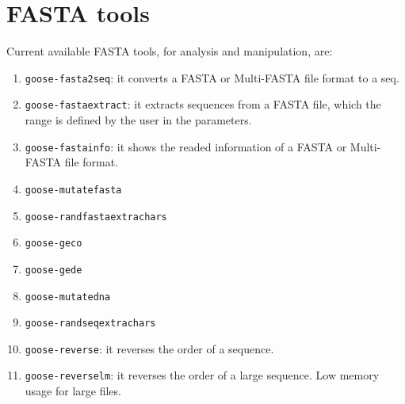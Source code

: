 \chapter{FASTA tools}
\label{fasta}

Current available FASTA tools, for analysis and manipulation, are:
\begin{enumerate}
\item \texttt{goose-fasta2seq}: it converts a FASTA or Multi-FASTA file format to a seq.
\item \texttt{goose-fastaextract}: it extracts sequences from a FASTA file, which the range is defined by the user in the parameters.
\item \texttt{goose-fastainfo}: it shows the readed information of a FASTA or Multi-FASTA file format.
\item \texttt{goose-mutatefasta}
\item \texttt{goose-randfastaextrachars}
\item \texttt{goose-geco}
\item \texttt{goose-gede}
\item \texttt{goose-mutatedna}
\item \texttt{goose-randseqextrachars}
\item \texttt{goose-reverse}: it reverses the order of a sequence.
\item \texttt{goose-reverselm}: it reverses the order of a large sequence. Low memory usage for large files.
\end{enumerate}



 
%
%
%
%
%
%
%
%